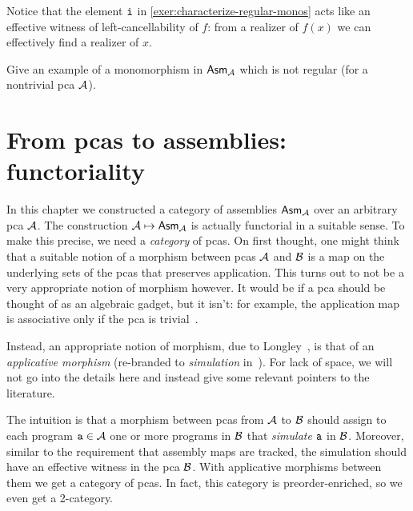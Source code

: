 Notice that the element \(\pca{i}\) in \cref{exer:characterize-regular-monos}
acts like an effective witness of left-cancellability of \(f\): from a realizer
of \(f(x)\) we can effectively find a realizer of \(x\).

\begin{exercise}\label{exer:mono-but-not-regular-mono}
  Give an example of a monomorphism in \(\Asm{\AA}\) which is not regular (for a
  nontrivial pca \(\AA\)).
\end{exercise}


\section{From pcas to assemblies: functoriality}
In this chapter we constructed a category of assemblies \(\Asm{\AA}\) over an
arbitrary pca \(\AA\). The construction \(\AA \mapsto \Asm{\AA}\) is actually
functorial in a suitable sense.
%
To make this precise, we need a \emph{category} of pcas.
%
On first thought, one might think that a suitable notion of a morphism between
pcas \(\AA\) and \(\BB\) is a map on the underlying sets of the pcas that
preserves application.
%
This turns out to not be a very appropriate notion of morphism however. It would
be if a pca should be thought of as an algebraic gadget, but it isn't: for
example, the application map is associative only if the pca is
trivial~\cite[Proposition~1.3.1]{vanOosten2008}.
%

Instead, an appropriate notion of morphism, due to Longley~\cite{Longley1995},
is that of an \emph{applicative morphism} (re-branded to \emph{simulation}
in~\cite{Bauer2023}).
%
For lack of space, we will not go into the details here and instead give some
relevant pointers to the literature.

The intuition is that a morphism between pcas from \(\AA\) to \(\BB\) should
assign to each program \(\pca{a} \in \AA\) one or more programs in \(\BB\) that
\emph{simulate} \(\pca{a}\) in \(\BB\).
%
Moreover, similar to the requirement that assembly maps are tracked, the
simulation should have an effective witness in the pca \(\BB\).
%
With applicative morphisms between them we get a category of pcas. In fact, this
category is preorder-enriched, so we even get a 2-category.


